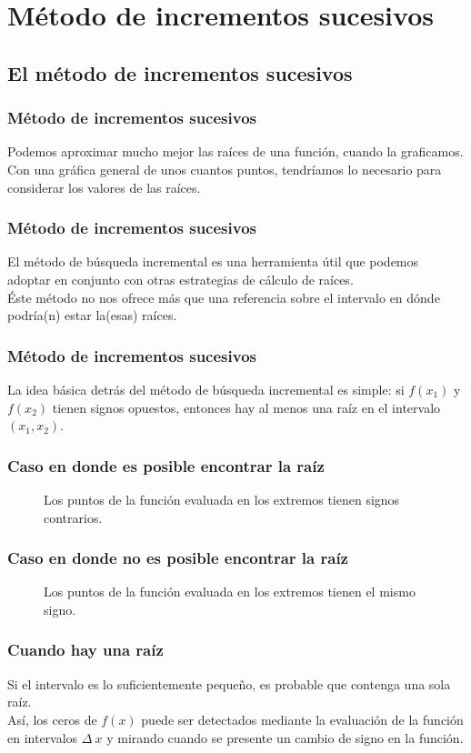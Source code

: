 \section{Método de incrementos sucesivos}
\subsection{El método de incrementos sucesivos}
\begin{frame}
\frametitle{Método de incrementos sucesivos}
Podemos aproximar mucho mejor las raíces de una función, cuando la graficamos.
\\
\bigskip
Con una gráfica general de unos cuantos puntos, tendríamos lo necesario para considerar los valores de las raíces.
\end{frame}
\begin{frame}
\frametitle{Método de incrementos sucesivos}
El método de búsqueda incremental es una herramienta útil que podemos adoptar en conjunto con otras estrategias de cálculo de raíces.
\\
\bigskip
Éste método no nos ofrece más que una referencia sobre el intervalo en dónde podría(n) estar la(esas) raíces.
\end{frame}
\begin{frame}
\frametitle{Método de incrementos sucesivos}
La idea básica detrás del método de búsqueda incremental es simple: si $f(x_{1})$ y $f(x_{2})$ tienen signos opuestos, entonces hay al menos una raíz en el intervalo $(x_{1}, x_{2})$.
\end{frame}
\begin{frame}[fragile]
\frametitle{Caso en donde es posible encontrar la raíz}
\begin{figure}
	\centering
	
	\caption{Los puntos de la función evaluada en los extremos tienen signos contrarios.}
\end{figure}
\end{frame}
\begin{frame}[fragile]
\frametitle{Caso en donde no es posible encontrar la raíz}
\begin{figure}
	\centering
	
	\caption{Los puntos de la función evaluada en los extremos tienen el mismo signo.}
\end{figure}
\end{frame}
\begin{frame}
\frametitle{Cuando hay una raíz}
Si el intervalo es lo suficientemente pequeño, es probable que contenga una sola raíz.
\\
\bigskip
Así, los ceros de $f(x)$ puede ser detectados mediante la evaluación de la función en  intervalos $\Delta \: x$ y mirando cuando se presente un cambio de signo en la función.
\end{frame}
